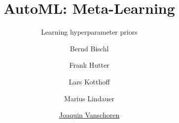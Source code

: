 
\usepackage{multimedia}

\title[Meta-Learning]{AutoML: Meta-Learning} 
\subtitle{Learning hyperparameter priors}
\author[Joaquin Vanschoren]{Bernd Bischl \and Frank Hutter \and Lars Kotthoff\newline \and Marius Lindauer \and \underline{Joaquin Vanschoren}}
\institute{}
\date{}


\maketitle


